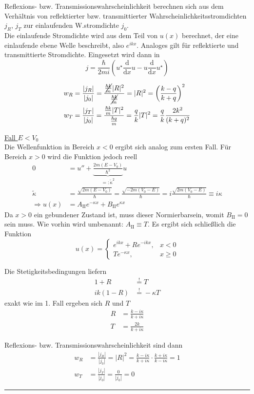\documentclass{article}
\newcommand{\diff}{\mathrm{d}}
\newcommand{\lr}[1]{\left(#1\right)}
\begin{document}
{	Reflexions- bzw. Transmissionswahrscheinlichkeit berechnen sich aus dem Verhältnis von reflektierter bzw. transmittierter Wahrscheinlichkeitsstromdichten $j_R$, $j_T$ zur einlaufenden W.stromdichte $j_0$.\\
	Die einlaufende Stromdichte wird aus dem Teil von $u(x)$ berechnet, der eine einlaufende ebene Welle beschreibt, also $e^{ikx}$. Analoges gilt für reflektierte und transmittierte Stromdichte. Eingesetzt wird dann in
		$$j = \frac{\hbar}{2mi}\lr{u^\star \frac{\diff}{\diff x}u - u \frac{\diff}{\diff x}u^\star}$$


\newpage
	

		\begin{align*}
			w_R &= \frac{|j_R|}{|j_0|} = \frac{\cancel{\frac{\hbar k}{m}}|R|^2}{\cancel{\frac{\hbar k}{m}}}  = |R|^2 = \lr{\frac{k - q}{k + q}}^2\\
			w_T &= \frac{|j_T|}{|j_0|} = \frac{\frac{\hbar k}{m}|T|^2}{\frac{\hbar q}{m}} = \frac{q}{k}|T|^2 = \frac{q}{k}\frac{2k^2}{(k + q)^2}
		\end{align*}


	\underline{Fall $E<V_0$}\\
	Die Wellenfunktion in Bereich $x<0$ ergibt sich analog zum ersten Fall. Für Bereich $x>0$ wird die Funktion jedoch reell
		\begin{align*}
			0 &= u'' + \underbrace{\frac{2m(E-V_0)}{\hbar^2}}_{=:\tilde{\kappa}^2}u \\
			\tilde{\kappa} &= \frac{\sqrt{2m(E-V_0)}}{\hbar} = \frac{\sqrt{-2m(V_0 - E)}}{\hbar} = i\frac{\sqrt{2m(V_0 - E)}}{\hbar} \equiv i\kappa \\
			\Rightarrow u(x) &= A_\text{II}e^{-\kappa x} + B_\text{II} e^{\kappa x}
		\end{align*}
	Da $x>0$ ein gebundener Zustand ist, muss dieser Normierbarsein, womit $B_\text{II}=0$ sein muss. Wie vorhin wird umbenannt: $A_\text{II}\equiv T$. Es ergibt sich schließlich die Funktion
		$$u(x) = 
		\begin{cases}
			e^{ikx} + Re^{-ikx}, & x<0 \\
			Te^{-\kappa x}, & x\geq 0
		\end{cases}$$

	Die Stetigkeitsbedingungen liefern
		\begin{align*}
			1 + R &\stackrel{!}{=} T \\
			ik(1 - R) &\stackrel{!}{=} -\kappa T
		\end{align*}
	exakt wie im 1. Fall ergeben sich $R$ und $T$ 
		\begin{align*}
			R &= \frac{k - i\kappa}{k + i\kappa} \\
			T &= \frac{2k}{k + i\kappa}
		\end{align*}

	Reflexions- bzw. Transmissionswahrscheinlichkeit sind dann
		\begin{align*}
			w_R &= \frac{|j_R|}{|j_0|} = |R|^2 = \frac{k - i\kappa}{k + i\kappa} \cdot \frac{k + i\kappa}{k - i\kappa} = 1\\
			w_T &= \frac{|j_T|}{|j_0|} = \frac{0}{|j_0|} = 0
		\end{align*}
	
\hrule
}
\end{document}
